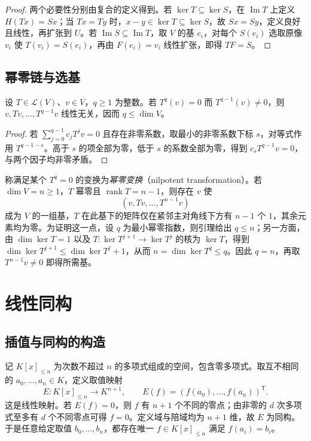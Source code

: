 \begin{proof}
两个必要性分别由复合的定义得到。若 $\ker T\subseteq\ker S$，在 $\operatorname{Im}T$ 上定义 $H(Tx)=Sx$；当 $Tx=Ty$ 时，$x-y\in\ker T\subseteq\ker S$，故 $Sx=Sy$，定义良好且线性，再扩张到 $U$。若 $\operatorname{Im}S\subseteq\operatorname{Im}T$，取 $V$ 的基 $e_i$，对每个 $S(e_i)$ 选取原像 $v_i$ 使 $T(v_i)=S(e_i)$，再由 $F(e_i)=v_i$ 线性扩张，即得 $TF=S$。
\end{proof}

\subsection{幂零链与选基}

\begin{lemma}
\label{lem:xie-ex-nilpotent-chain}
设 $T\in\mathcal L(V)$、$v\in V$，$q\geq1$ 为整数。若 $T^{q}(v)=0$ 而 $T^{q-1}(v)\ne0$，则 $v,Tv,\ldots,T^{q-1}v$ 线性无关，因而 $q\leq\dim V$。
\end{lemma}

\begin{proof}
若 $\sum_{j=0}^{q-1}c_jT^jv=0$ 且存在非零系数，取最小的非零系数下标 $s$，对等式作用 $T^{q-1-s}$。高于 $s$ 的项全部为零，低于 $s$ 的系数全部为零，得到 $c_sT^{q-1}v=0$，与两个因子均非零矛盾。
\end{proof}

称满足某个 $T^q=0$ 的变换为\emph{幂零变换}（nilpotent transformation）。若 $\dim V=n\geq1$，$T$ 幂零且 $\operatorname{rank}T=n-1$，则存在 $v$ 使
\[
    (v,Tv,\ldots,T^{n-1}v)
\]
成为 $V$ 的一组基，$T$ 在此基下的矩阵仅在紧邻主对角线下方有 $n-1$ 个 $1$，其余元素均为零。为证明这一点，设 $q$ 为最小幂零指数，则引理给出 $q\leq n$；另一方面，由 $\dim\ker T=1$ 以及 $T:\ker T^{j+1}\to\ker T^j$ 的核为 $\ker T$，得到 $\dim\ker T^{j+1}\leq\dim\ker T^j+1$，从而 $n=\dim\ker T^q\leq q$。因此 $q=n$，再取 $T^{n-1}v\ne0$ 即得所需基。

\section{线性同构}
\label{sec:xie-ex-linear-isomorphisms}

\subsection{插值与同构的构造}

记 $K[x]_{\leq n}$ 为次数不超过 $n$ 的多项式组成的空间，包含零多项式。取互不相同的 $a_0,\ldots,a_n\in K$，定义取值映射
\[
    E:K[x]_{\leq n}\to K^{n+1},\qquad
    E(f)=(f(a_0),\ldots,f(a_n))^{\mathsf T}.
\]
这是线性映射。若 $E(f)=0$，则 $f$ 有 $n+1$ 个不同的零点；由非零的 $d$ 次多项式至多有 $d$ 个不同零点可得 $f=0$。定义域与陪域均为 $n+1$ 维，故 $E$ 为同构。于是任意给定取值 $b_0,\ldots,b_n$，都存在唯一 $f\in K[x]_{\leq n}$ 满足 $f(a_i)=b_i$。

